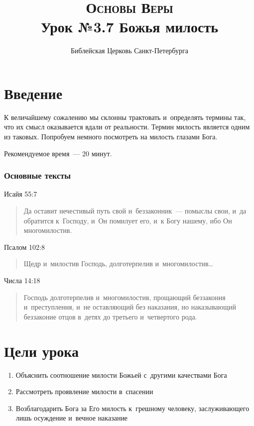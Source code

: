 \documentclass[a4paper,12pt]{article}
\title{\textsc{Основы Веры}\\Урок №3.7 Божья милость}
\author{Библейская Церковь Санкт-Петербурга}
\date{}
\begin{document}
\maketitle

\thispagestyle{empty}

\tableofcontents

\section*{Введение}

К величайшему сожалению мы склонны трактовать и~определять термины так, что их смысл оказывается вдали от реальности. Термин милость является одним из таковых. Попробуем немного посмотреть на милость глазами Бога.

Рекомендуемое время~--- 20 минут.
        
\subsubsection*{Основные тексты}

\noindent Исайя 55:7

\begin{quote}
Да оставит нечестивый путь свой и~беззаконник~--- помыслы свои, и~да обратится к~Господу, и~Он помилует его, и~к Богу нашему, ибо Он многомилостив. 
\end{quote}

\noindent Псалом 102:8

\begin{quote}
Щедр и~милостив Господь, долготерпелив и~многомилостив\ldots 
\end{quote}

\noindent Числа 14:18
\begin{quote}
Господь долготерпелив и~многомилостив, прощающий беззакония и~преступления, и~не оставляющий без наказания, но наказывающий беззаконие отцов в~детях до третьего и~четвертого рода.
\end{quote}

\section*{Цели урока}

\begin{enumerate}
    \item Объяснить соотношение милости Божьей с~другими качествами Бога
    \item Рассмотреть проявление милости в~спасении
    \item Возблагодарить Бога за Его милость к~грешному человеку, заслуживающего лишь осуждение и~вечное наказание
\end{enumerate}
\end{document}
